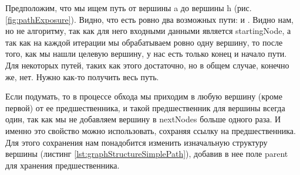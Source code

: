 \documentclass[../../article.tex]{subfiles}
\begin{document}
Предположим, что мы ищем путь от вершины {\firacodebold a} до вершины {\firacodebold h} (рис. \ref{fig:pathExposure}). Видно, что есть ровно два возможных пути: {\firacodebold [a, h]} и {\firacodebold [a, f, g, h]}. Видно нам, но не алгоритму, так как для него входными данными является {\firacodebold startingNode}, а так как на каждой итерации мы обрабатываем ровно одну вершину, то после того, как мы нашли целевую вершину, у нас есть только конец и начало пути. Для некоторых путей, таких как {\firacodebold [a, h]} этого достаточно, но в общем случае, конечно же, нет. Нужно как-то получить весь путь.

Если подумать, то в процессе обхода мы приходим в любую вершину (кроме первой) от ее предшественника, и такой предшественник для вершины всегда один, так как мы не добавляем вершину в {\firacodebold nextNodes} больше одного раза. И именно это свойство можно использовать, сохраняя ссылку на предшественника. Для этого сохранения нам понадобится изменить изначальную структуру вершины (листинг \ref{lst:graphStructureSimplePath}), добавив в нее поле {\firacodebold parent} для хранения предшественника.
\end{document}
